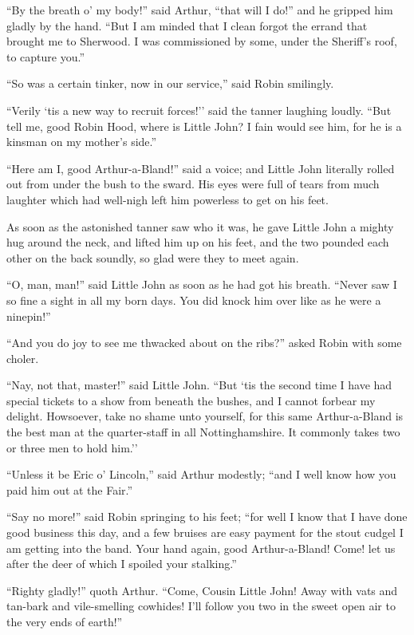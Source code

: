 ``By the breath o' my body!'' said Arthur, ``that will I do!'' and he
gripped him gladly by the hand. ``But I am minded that I clean forgot
the errand that brought me to Sherwood. I was commissioned by some,
under the Sheriff's roof, to capture you.''

``So was a certain tinker, now in our service,'' said Robin smilingly.

``Verily `tis a new way to recruit forces!'' said the tanner laughing
loudly. ``But tell me, good Robin Hood, where is Little John? I fain
would see him, for he is a kinsman on my mother's side.''

``Here am I, good Arthur-a-Bland!'' said a voice; and Little John
literally rolled out from under the bush to the sward. His eyes were
full of tears from much laughter which had well-nigh left him powerless
to get on his feet.

As soon as the astonished tanner saw who it was, he gave Little John a
mighty hug around the neck, and lifted him up on his feet, and the two
pounded each other on the back soundly, so glad were they to meet again.

``O, man, man!'' said Little John as soon as he had got his breath.
``Never saw I so fine a sight in all my born days. You did knock him
over like as he were a ninepin!''

``And you do joy to see me thwacked about on the ribs?'' asked Robin
with some choler.

``Nay, not that, master!'' said Little John. ``But `tis the second time
I have had special tickets to a show from beneath the bushes, and I
cannot forbear my delight. Howsoever, take no shame unto yourself, for
this same Arthur-a-Bland is the best man at the quarter-staff in all
Nottinghamshire. It commonly takes two or three men to hold him.''

``Unless it be Eric o' Lincoln,'' said Arthur modestly; ``and I well
know how you paid him out at the Fair.''

``Say no more!'' said Robin springing to his feet; ``for well I know
that I have done good business this day, and a few bruises are easy
payment for the stout cudgel I am getting into the band. Your hand
again, good Arthur-a-Bland! Come! let us after the deer of which I
spoiled your stalking.''

``Righty gladly!'' quoth Arthur. ``Come, Cousin Little John! Away with
vats and tan-bark and vile-smelling cowhides! I'll follow you two in the
sweet open air to the very ends of earth!''
